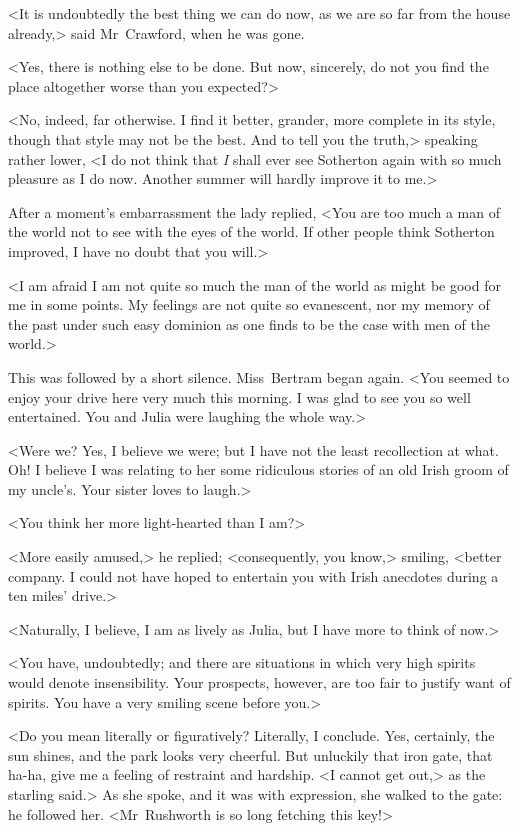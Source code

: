 <It is undoubtedly the best thing we can do now, as we are so far from the house already,> said Mr~Crawford, when he was gone.

<Yes, there is nothing else to be done. But now, sincerely, do not you find the place altogether worse than you expected?>

<No, indeed, far otherwise. I find it better, grander, more complete in its style, though that style may not be the best. And to tell you the truth,> speaking rather lower, <I do not think that \textit{I}  shall ever see Sotherton again with so much pleasure as I do now. Another summer will hardly improve it to me.>

After a moment's embarrassment the lady replied, <You are too much a man of the world not to see with the eyes of the world. If other people think Sotherton improved, I have no doubt that you will.>

<I am afraid I am not quite so much the man of the world as might be good for me in some points. My feelings are not quite so evanescent, nor my memory of the past under such easy dominion as one finds to be the case with men of the world.>

This was followed by a short silence. Miss~Bertram began again. <You seemed to enjoy your drive here very much this morning. I was glad to see you so well entertained. You and Julia were laughing the whole way.>

<Were we? Yes, I believe we were; but I have not the least recollection at what. Oh! I believe I was relating to her some ridiculous stories of an old Irish groom of my uncle's. Your sister loves to laugh.>

<You think her more light-hearted than I am?>

<More easily amused,> he replied; <consequently, you know,> smiling, <better company. I could not have hoped to entertain you with Irish anecdotes during a ten miles' drive.>

<Naturally, I believe, I am as lively as Julia, but I have more to think of now.>

<You have, undoubtedly; and there are situations in which very high spirits would denote insensibility. Your prospects, however, are too fair to justify want of spirits. You have a very smiling scene before you.>

<Do you mean literally or figuratively? Literally, I conclude. Yes, certainly, the sun shines, and the park looks very cheerful. But unluckily that iron gate, that ha-ha, give me a feeling of restraint and hardship. <I cannot get out,> as the starling said.> As she spoke, and it was with expression, she walked to the gate: he followed her. <Mr~Rushworth is so long fetching this key!>

